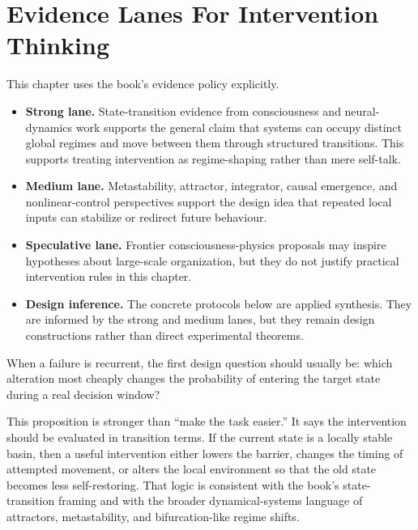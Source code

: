 \section{Evidence Lanes For Intervention Thinking}

This chapter uses the book's evidence policy explicitly.

\begin{itemize}[nosep]
  \item \textbf{Strong lane.} State-transition evidence from consciousness and
        neural-dynamics work supports the general claim that systems can occupy
        distinct global regimes and move between them through structured
        transitions. This supports treating intervention as regime-shaping
        rather than mere self-talk.
  \item \textbf{Medium lane.} Metastability, attractor, integrator, causal
        emergence, and nonlinear-control perspectives support the design idea
        that repeated local inputs can stabilize or redirect future behaviour.
  \item \textbf{Speculative lane.} Frontier consciousness-physics proposals may
        inspire hypotheses about large-scale organization, but they do not
        justify practical intervention rules in this chapter.
  \item \textbf{Design inference.} The concrete protocols below are applied
        synthesis. They are informed by the strong and medium lanes, but they
        remain design constructions rather than direct experimental theorems.
\end{itemize}

\begin{proposition}
When a failure is recurrent, the first design question should usually be:
which alteration most cheaply changes the probability of entering the target
state during a real decision window?
\end{proposition}

\begin{discussion}
This proposition is stronger than ``make the task easier.'' It says the
intervention should be evaluated in transition terms. If the current state is a
locally stable basin, then a useful intervention either lowers the barrier,
changes the timing of attempted movement, or alters the local environment so
that the old state becomes less self-restoring. That logic is consistent with
the book's state-transition framing and with the broader dynamical-systems
language of attractors, metastability, and bifurcation-like regime shifts.
\end{discussion}
